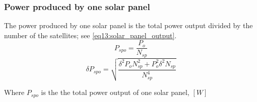 \documentclass[stu, 11pt, a4paper, floatsintext, noextraspace]{apa7}
\begin{document}
	\subsubsection{Power produced by one solar panel}
	The power produced by one solar panel is the total power output divided by the number of the satellites; see \cref{eq13:solar_panel_output}.
	\begin{equation}
		\label{eq13:solar_panel_output}
		P_{spo}=\frac{P_o}{N_{sp}}
	\end{equation}
	\begin{equation*}
		\delta P_{spo}=\sqrt{\frac{\delta^2P_oN_{sp}^2+P_o^2\delta^2N_{sp}}{N_{sp}^4}}
	\end{equation*}
	\begin{center}
		Where $P_{spo}$ is the the total power output of one solar panel, $[W]$
	\end{center}
	\newpage
\end{document}
